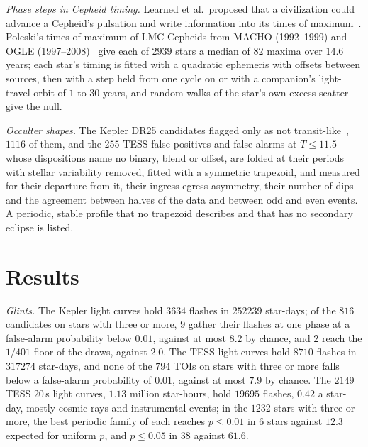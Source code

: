 \documentclass[3p,11pt]{elsarticle}
\begin{document}
\emph{Phase steps in Cepheid timing.} Learned et al.\ proposed that a civilization could
advance a Cepheid's pulsation and write information into its times of
maximum~\cite{Learned2012}. Poleski's times of maximum of LMC Cepheids from MACHO
(1992--1999) and OGLE (1997--2008)~\cite{Poleski2008} give each of $2939$ stars a median
of $82$ maxima over $14.6$ years; each star's timing is fitted with a quadratic ephemeris
with offsets between sources, then with a step held from one cycle on or with a
companion's light-travel orbit of $1$ to $30$ years, and random walks of the star's own
excess scatter give the null.

\emph{Occulter shapes.} The Kepler DR25 candidates flagged only as not
transit-like~\cite{Thompson2018}, $1116$ of them, and the $255$ TESS false positives and
false alarms at $T\le11.5$ whose dispositions name no binary, blend or offset, are folded
at their periods with stellar variability removed, fitted with a symmetric trapezoid, and
measured for their departure from it, their ingress-egress asymmetry, their number of
dips and the agreement between halves of the data and between odd and even events. A
periodic, stable profile that no trapezoid describes and that has no secondary eclipse
is listed.

\section{Results}\label{sec:results}

\emph{Glints.} The Kepler light curves hold $3634$ flashes in $252239$ star-days; of the
$816$ candidates on stars with three or more, $9$ gather their flashes at one phase at a
false-alarm probability below $0.01$, against at most $8.2$ by chance, and $2$ reach the
$1/401$ floor of the draws, against $2.0$. The TESS light curves hold $8710$ flashes in
$317274$ star-days, and none of the $794$ TOIs on stars with three or more falls below a
false-alarm probability of $0.01$, against at most $7.9$ by chance. The $2149$ TESS
$20$\,s light curves, $1.13$ million star-hours, hold $19695$ flashes, $0.42$ a star-day,
mostly cosmic rays and instrumental events; in the $1232$ stars with three or more, the
best periodic family of each reaches $p\le0.01$ in $6$ stars against $12.3$ expected for
uniform $p$, and $p\le0.05$ in $38$ against $61.6$.
\end{document}
